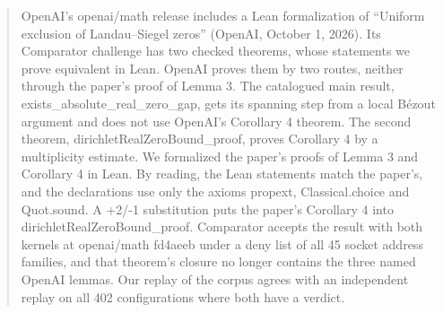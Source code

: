 \begin{abstract}
OpenAI's openai/math release includes a Lean formalization of ``Uniform exclusion of Landau--Siegel zeros'' (OpenAI, October 1, 2026). %
Its Comparator challenge has two checked theorems, whose statements we prove equivalent in Lean. %
OpenAI proves them by two routes, neither through the paper's proof of Lemma 3. %
The catalogued main result, exists\_absolute\_real\_zero\_gap, gets its spanning step from a local B\'ezout argument and does not use OpenAI's Corollary 4 theorem. %
The second theorem, dirichletRealZeroBound\_proof, proves Corollary 4 by a multiplicity estimate. %
We formalized the paper's proofs of Lemma 3 and Corollary 4 in Lean. %
By reading, the Lean statements match the paper's, and the declarations use only the axioms propext, Classical.choice and Quot.sound. %
A +2/-1 substitution puts the paper's Corollary 4 into dirichletRealZeroBound\_proof. %
Comparator accepts the result with both kernels at openai/math fd4aeeb under a deny list of all 45 socket address families, and that theorem's closure no longer contains the three named OpenAI lemmas. %
Our replay of the corpus agrees with an independent replay on all 402 configurations where both have a verdict. %
\end{abstract}
